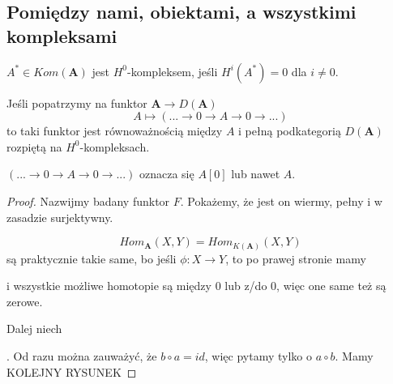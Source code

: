 \subsection{Pomiędzy nami, obiektami, a wszystkimi kompleksami}

\begin{definition}
  $A^*\in Kom(\mathbf{A})$ jest $H^0$-kompleksem, jeśli $H^i(A^*)=0$ dla $i\neq 0$.
\end{definition}

\begin{fact}
  Jeśli popatrzymy na funktor $\mathbf{A}\to D(\mathbf{A})$
  $$A\mapsto (...\to 0\to A\to 0\to ...)$$
  to taki funktor jest równoważnością między $A$ i pełną podkategorią $D(\mathbf{A})$ rozpiętą na $H^0$-kompleksach.
\end{fact}

$(...\to0\to A\to0\to...)$ oznacza się $A[0]$ lub nawet $A$.

\begin{proof}
  Nazwijmy badany funktor $F$. Pokażemy, że jest on wiermy, pełny i w zasadzie surjektywny.

  $$Hom_{\mathbf{A}}(X, Y)=Hom_{K(\mathbf{A})}(X, Y)$$
  są praktycznie takie same, bo jeśli $\phi: X\to Y$, to po prawej stronie mamy
  \begin{center}\end{center}
  i wszystkie możliwe homotopie są między $0$ lub z/do $0$, więc one same też są zerowe.

  Dalej niech . Od razu można zauważyć, że $b\circ a=id$, więc pytamy tylko o $a\circ b$. Mamy 
  {\large\color{red}KOLEJNY RYSUNEK}
\end{proof}
